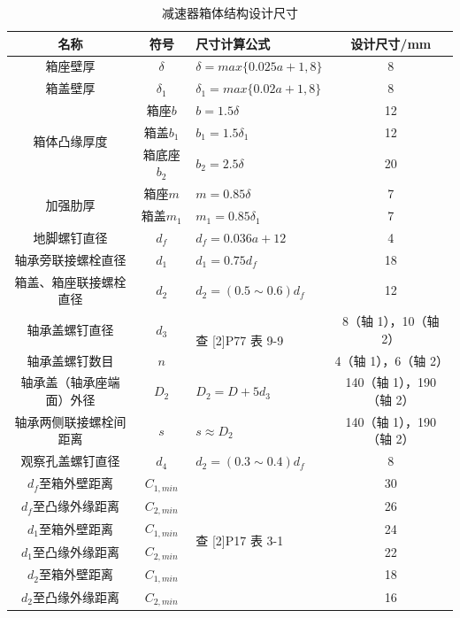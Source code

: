 \documentclass[12pt]{ctexart}
\begin{document}
\begin{table}[htbp]
    \centering
    \begin{tabular}{c c l c}
        \toprule
        \textbf{名称} & \textbf{符号} & \textbf{尺寸计算公式} & \textbf{设计尺寸/mm} \\
        \midrule
        箱座壁厚                      & $\delta$    & $\delta = max\{0.025a+1,8\}$    & 8 \\
        箱盖壁厚                      & $\delta_1$  & $\delta_1 = max\{0.02a+1,8\}$   & 8 \\
        \multirow{3}{*}{箱体凸缘厚度} & 箱座$b$      & $b=1.5\delta $                  & 12\\
                                     & 箱盖$b_1$    & $b_1 =1.5\delta_1$              & 12\\
                                     & 箱底座$b_2$  & $b_2 =2.5\delta$                & 20 \\
        \multirow{2}{*}{加强肋厚}     & 箱座$m$      & $m=0.85\delta $                & 7 \\
                                     & 箱盖$m_1$    & $m_1=0.85\delta_1$              & 7\\
        地脚螺钉直径                  & $d_f$        & $d_f=0.036a+12$                 & 4 \\
        轴承旁联接螺栓直径             & $d_1$        & $d_1=0.75d_f$                  & 18\\
        箱盖、箱座联接螺栓直径         & $d_2$        & $d_2=(0.5\sim 0.6)d_f$         & 12 \\
        轴承盖螺钉直径                & $d_3$        & \multirow{2}{*}{查 [2]P77 表 9-9} & 8（轴 1），10（轴 2） \\
        轴承盖螺钉数目                & $n$          &                                 & 4（轴 1），6（轴 2）\\
        轴承盖（轴承座端面）外径       & $D_2$        & $D_2=D+5d_3$                    & 140（轴 1），190（轴 2） \\
        轴承两侧联接螺栓间距离         & $s$          & $s\approx D_2$                  & 140（轴 1），190（轴 2）\\
        观察孔盖螺钉直径              & $d_4$        & $d_2=(0.3\sim 0.4)d_f$          & 8 \\
        $d_f$至箱外壁距离             & $C_{1,min}$  & \multirow{6}{*}{查 [2]P17 表 3-1}  & 30\\
        $d_f$至凸缘外缘距离           & $C_{2,min}$  & & 26\\
        $d_1$至箱外壁距离             & $C_{1,min}$  & & 24\\
        $d_1$至凸缘外缘距离           & $C_{2,min}$  & & 22\\
        $d_2$至箱外壁距离             & $C_{1,min}$  & & 18\\
        $d_2$至凸缘外缘距离           & $C_{2,min}$  & & 16\\

         \bottomrule
    \end{tabular}
    \caption{减速器箱体结构设计尺寸}
    \label{table11}
\end{table}
\end{document}
